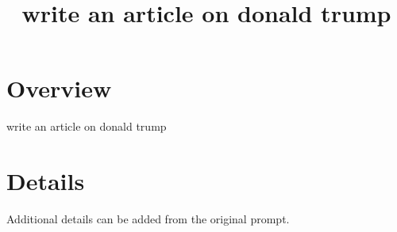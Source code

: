 \documentclass[12pt, a4paper]{article}
\title{write an article on donald trump}
\author{}
\date{}
\begin{document}
\maketitle

\section*{Overview}
write an article on donald trump

\section*{Details}
Additional details can be added from the original prompt. 
\end{document}
